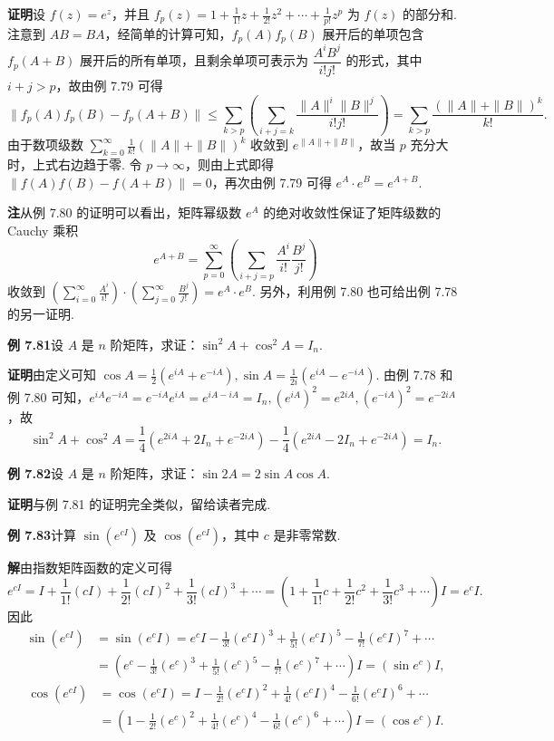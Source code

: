 \documentclass[UTF8, 12pt, fontset=fandol, oneside]{ctexart}
\begin{document}
\noindent\textbf{证明}\quad 设 $f(z)=e^z$，并且 $f_p(z)=1+\frac1{1!}z+\frac1{2!}z^2+\cdots+\frac1{p!}z^p$ 为 $f(z)$ 的部分和. 注意到 $AB=BA$，经简单的计算可知，$f_p(A)f_p(B)$ 展开后的单项包含 $f_p(A+B)$ 展开后的所有单项，且剩余单项可表示为 $\dfrac{A^iB^j}{i!j!}$ 的形式，其中 $i+j>p$，故由例 7.79 可得
\[
\|f_p(A)f_p(B)-f_p(A+B)\|\le\sum_{k>p}\left(\sum_{i+j=k}\frac{\|A\|^i\|B\|^j}{i!j!}\right)=\sum_{k>p}\frac{(\|A\|+\|B\|)^k}{k!}.
\]
由于数项级数 $\sum_{k=0}^{\infty}\frac1{k!}(\|A\|+\|B\|)^k$ 收敛到 $e^{\|A\|+\|B\|}$，故当 $p$ 充分大时，上式右边趋于零. 令 $p\to\infty$，则由上式即得 $\|f(A)f(B)-f(A+B)\|=0$，再次由例 7.79 可得 $e^A\cdot e^B=e^{A+B}$.

\noindent\textbf{注}\quad 从例 7.80 的证明可以看出，矩阵幂级数 $e^A$ 的绝对收敛性保证了矩阵级数的 Cauchy 乘积
\[
e^{A+B}=\sum_{p=0}^{\infty}\left(\sum_{i+j=p}\frac{A^i}{i!}\frac{B^j}{j!}\right)
\]
收敛到 $\left(\sum_{i=0}^{\infty}\frac{A^i}{i!}\right)\cdot\left(\sum_{j=0}^{\infty}\frac{B^j}{j!}\right)=e^A\cdot e^B$. 另外，利用例 7.80 也可给出例 7.78 的另一证明.

\noindent\textbf{例 7.81}\quad 设 $A$ 是 $n$ 阶矩阵，求证：$\sin^2A+\cos^2A=I_n$.

\noindent\textbf{证明}\quad 由定义可知 $\cos A=\frac12(e^{iA}+e^{-iA}),\sin A=\frac1{2i}(e^{iA}-e^{-iA})$. 由例 7.78 和例 7.80 可知，$e^{iA}e^{-iA}=e^{-iA}e^{iA}=e^{iA-iA}=I_n,(e^{iA})^2=e^{2iA},(e^{-iA})^2=e^{-2iA}$，故
\[
\sin^2A+\cos^2A=\frac14(e^{2iA}+2I_n+e^{-2iA})-\frac14(e^{2iA}-2I_n+e^{-2iA})=I_n.
\]

\noindent\textbf{例 7.82}\quad 设 $A$ 是 $n$ 阶矩阵，求证：$\sin2A=2\sin A\cos A$.

\noindent\textbf{证明}\quad 与例 7.81 的证明完全类似，留给读者完成.

\noindent\textbf{例 7.83}\quad 计算 $\sin(e^{cI})$ 及 $\cos(e^{cI})$，其中 $c$ 是非零常数.

\noindent\textbf{解}\quad 由指数矩阵函数的定义可得
\[
e^{cI}=I+\frac1{1!}(cI)+\frac1{2!}(cI)^2+\frac1{3!}(cI)^3+\cdots
=\left(1+\frac1{1!}c+\frac1{2!}c^2+\frac1{3!}c^3+\cdots\right)I=e^cI.
\]
因此
\[
\begin{aligned}
\sin(e^{cI})&=\sin(e^cI)=e^cI-\frac1{3!}(e^cI)^3+\frac1{5!}(e^cI)^5-\frac1{7!}(e^cI)^7+\cdots\\
&=\left(e^c-\frac1{3!}(e^c)^3+\frac1{5!}(e^c)^5-\frac1{7!}(e^c)^7+\cdots\right)I=(\sin e^c)I,
\end{aligned}
\]
\[
\begin{aligned}
\cos(e^{cI})&=\cos(e^cI)=I-\frac1{2!}(e^cI)^2+\frac1{4!}(e^cI)^4-\frac1{6!}(e^cI)^6+\cdots\\
&=\left(1-\frac1{2!}(e^c)^2+\frac1{4!}(e^c)^4-\frac1{6!}(e^c)^6+\cdots\right)I=(\cos e^c)I.
\end{aligned}
\]
\end{document}
